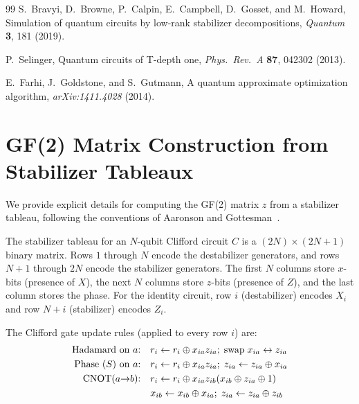 \documentclass[a4paper,twocolumn,11pt]{quantumarticle}
\begin{document}
\begin{thebibliography}{99}
S.~Bravyi, D.~Browne, P.~Calpin, E.~Campbell, D.~Gosset, and M.~Howard,
Simulation of quantum circuits by low-rank stabilizer decompositions,
\textit{Quantum} \textbf{3}, 181 (2019).

P.~Selinger,
Quantum circuits of T-depth one,
\textit{Phys.\ Rev.\ A} \textbf{87}, 042302 (2013).

E.~Farhi, J.~Goldstone, and S.~Gutmann,
A quantum approximate optimization algorithm,
\textit{arXiv:1411.4028} (2014).

\end{thebibliography}

\appendix

\section{GF(2) Matrix Construction from Stabilizer Tableaux}
\label{app:gf2_construction}

We provide explicit details for computing the GF(2) matrix $z$ from a stabilizer tableau, following the conventions of Aaronson and Gottesman~\cite{Aaronson2004}.

The stabilizer tableau for an $N$-qubit Clifford circuit $C$ is a $(2N) \times (2N+1)$ binary matrix.
Rows $1$ through $N$ encode the destabilizer generators, and rows $N+1$ through $2N$ encode the stabilizer generators.
The first $N$ columns store $x$-bits (presence of $X$), the next $N$ columns store $z$-bits (presence of $Z$), and the last column stores the phase.
For the identity circuit, row $i$ (destabilizer) encodes $X_i$ and row $N+i$ (stabilizer) encodes $Z_i$.

The Clifford gate update rules (applied to every row $i$) are:
\begin{align}
\text{Hadamard on $a$:}&\quad r_i \leftarrow r_i \oplus x_{ia}z_{ia};\; \text{swap}\; x_{ia} \leftrightarrow z_{ia} \\
\text{Phase ($S$) on $a$:}&\quad r_i \leftarrow r_i \oplus x_{ia}z_{ia};\; z_{ia} \leftarrow z_{ia} \oplus x_{ia} \\
\text{CNOT($a {\to} b$):}&\quad r_i \leftarrow r_i \oplus x_{ia}z_{ib}(x_{ib} \oplus z_{ia} \oplus 1) \notag\\
&\quad x_{ib} \leftarrow x_{ib} \oplus x_{ia};\; z_{ia} \leftarrow z_{ia} \oplus z_{ib}
\end{align}
\end{document}
